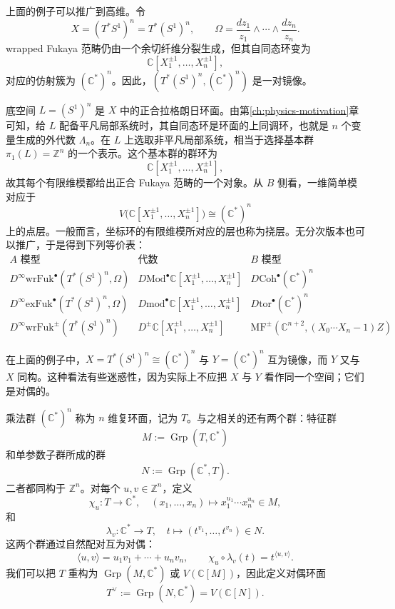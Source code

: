 上面的例子可以推广到高维。令
\[
  X=(T^*S^1)^n=T^*(S^1)^n,
  \qquad
  \Omega=\frac{dz_1}{z_1}\wedge\cdots\wedge\frac{dz_n}{z_n}.
\]
wrapped Fukaya 范畴仍由一个余切纤维分裂生成，但其自同态环变为
\[
  \mathbb C[X_1^{\pm1},\ldots,X_n^{\pm1}],
\]
对应的仿射簇为 $(\mathbb C^*)^n$。因此，$(T^*(S^1)^n,(\mathbb C^*)^n)$ 是一对镜像。

底空间 $L=(S^1)^n$ 是 $X$ 中的正合拉格朗日环面。由第\ref{ch:physics-motivation}章可知，给 $L$ 配备平凡局部系统时，其自同态环是环面的上同调环，也就是 $n$ 个变量生成的外代数 $\Lambda_n$。在 $L$ 上选取非平凡局部系统，相当于选择基本群 $\pi_1(L)=\mathbb Z^n$ 的一个表示。这个基本群的群环为
\[
  \mathbb C[X_1^{\pm1},\ldots,X_n^{\pm1}],
\]
故其每个有限维模都给出正合 Fukaya 范畴的一个对象。从 $B$ 侧看，一维简单模对应于
\[
  V\bigl(\mathbb C[X_1^{\pm1},\ldots,X_n^{\pm1}]\bigr)\cong(\mathbb C^*)^n
\]
上的点层。一般而言，坐标环的有限维模所对应的层也称为挠层。无分次版本也可以推广，于是得到下列等价表：
\[
\begin{array}{c|c|c}
\text{$A$ 模型} & \text{代数} & \text{$B$ 模型}\\\hline
D^{\infty}\mathrm{wrFuk}^{\bullet}(T^*(S^1)^n,\Omega)
 &D\mathrm{Mod}^{\bullet}\mathbb C[X_1^{\pm1},\ldots,X_n^{\pm1}]
 &D\mathrm{Coh}^{\bullet}(\mathbb C^*)^n\\
D^{\infty}\mathrm{exFuk}^{\bullet}(T^*(S^1)^n,\Omega)
 &D\mathrm{mod}^{\bullet}\mathbb C[X_1^{\pm1},\ldots,X_n^{\pm1}]
 &D\mathrm{tor}^{\bullet}(\mathbb C^*)^n\\
D^{\infty}\mathrm{wrFuk}^{\pm}(T^*(S^1)^n)
 &D^{\pm}\mathbb C[X_1^{\pm1},\ldots,X_n^{\pm1}]
 &\mathrm{MF}^{\pm}(\mathbb C^{n+2},(X_0\cdots X_n-1)Z)
\end{array}
\]

在上面的例子中，$X=T^*(S^1)^n\cong(\mathbb C^*)^n$ 与 $Y=(\mathbb C^*)^n$ 互为镜像，而 $Y$ 又与 $X$ 同构。这种看法有些迷惑性，因为实际上不应把 $X$ 与 $Y$ 看作同一个空间；它们是对偶的。

乘法群 $(\mathbb C^*)^n$ 称为 $n$ 维复环面，记为 $T$。与之相关的还有两个群：特征群
\[
  M:=\operatorname{Grp}(T,\mathbb C^*)
\]
和单参数子群所成的群
\[
  N:=\operatorname{Grp}(\mathbb C^*,T).
\]
二者都同构于 $\mathbb Z^n$。对每个 $u,v\in\mathbb Z^n$，定义
\[
  \chi_u\colon T\to\mathbb C^*,\quad
  (x_1,\ldots,x_n)\longmapsto x_1^{u_1}\cdots x_n^{u_n}\in M,
\]
和
\[
  \lambda_v\colon\mathbb C^*\to T,\quad
  t\longmapsto(t^{v_1},\ldots,t^{v_n})\in N.
\]
这两个群通过自然配对互为对偶：
\[
  \langle u,v\rangle=u_1v_1+\cdots+u_nv_n,
  \qquad \chi_u\circ\lambda_v(t)=t^{\langle u,v\rangle}.
\]
我们可以把 $T$ 重构为 $\operatorname{Grp}(M,\mathbb C^*)$ 或 $V(\mathbb C[M])$，因此定义对偶环面
\[
  T^\vee:=\operatorname{Grp}(N,\mathbb C^*)=V(\mathbb C[N]).
\]

